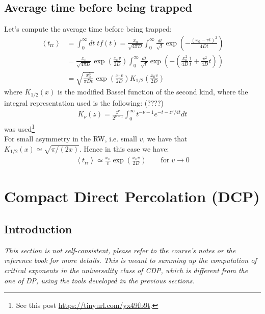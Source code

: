 \documentclass[4apaper,11pt,fleqn]{article}
\theoremstyle{remark}
\theoremstyle{definition}
\begin{document}
\subsection{Average time before being trapped}
\label{sebsec:t_trapp}
Let's compute the average time before being trapped:
\begin{align*}
  \left\langle t_{\mathrm{rr}}\right\rangle &=\int_{0}^{\infty} dt\; t f(t)=\frac{x_{0}}{\sqrt{4 \pi D}} \int_{0}^{\infty} \frac{d t}{\sqrt{t}} \exp \left(-\frac{\left(x_{0}-v t\right)^{2}}{4 D t}\right) \\ &=\frac{x_{0}}{\sqrt{4 \pi D}} \exp \left(\frac{x_{0} v}{2 D}\right) \int_{0}^{\infty} \frac{d t}{\sqrt{t}} \exp \left(-\left(\frac{x_{0}^{2}}{4 D} \frac{1}{t}+\frac{v^{2}}{4 D} t\right)\right) \\ &=\sqrt{\frac{x_{0}^{3}}{\pi D v}} \exp \left(\frac{x_{0} v}{2 D}\right) K_{1 / 2}\left(\frac{x_{0} v}{2 D}\right)
\end{align*}
where $K_{1 / 2}(x)$ is the modified Bassel function of the second kind, where the integral representation used is the following: (????)
\begin{align*}
  K_{\nu}(z)=\frac{z^{\nu}}{2^{\nu+1}} \int_{0}^{\infty} t^{-\nu-1} e^{-t-z^{2} / 4 t} d t
\end{align*}
was used\footnote{See this post \url{https://tinyurl.com/yx49fb9t}.}\\
For small asymmetry in the RW, i.e. small $v$, we have that $K_{1/2}(x) \simeq \sqrt{\pi/(2x)}$. Hence in this case we have:
\begin{align}
  \label{eq:trr}
  \boxed{\left\langle t_{\mathrm{rr}}\right\rangle \simeq \frac{x_0}{v} \exp \left( \frac{x_0v}{2D} \right)} \qquad \text{for} \; v \rightarrow 0
\end{align}


\section{Compact Direct Percolation (DCP)}

\subsection{Introduction}
\emph{This section is not self-consistent, please refer to the course's notes or the reference book for more details. This is meant to summing up the computation of critical exponents in the universality class of CDP, which is different from the one of DP, using the tools developed in the previous sections.}
\end{document}
